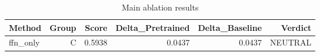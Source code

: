 \begin{table}[htbp]
\centering
\caption{Main ablation results}
\label{tab:main-results}
\begin{tabular}{lrrrrr}
\toprule
\textbf{Method} & \textbf{Group} & \textbf{Score} & \textbf{Delta\_Pretrained} & \textbf{Delta\_Baseline} & \textbf{Verdict} \\
\midrule
ffn\_only & C & 0.5938 & 0.0437 & 0.0437 & NEUTRAL \\
\bottomrule
\end{tabular}
\end{table}